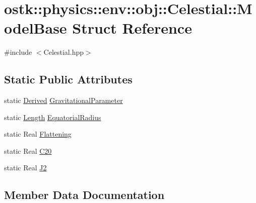 \hypertarget{structostk_1_1physics_1_1env_1_1obj_1_1_celestial_1_1_model_base}{}\section{ostk\+:\+:physics\+:\+:env\+:\+:obj\+:\+:Celestial\+:\+:Model\+Base Struct Reference}
\label{structostk_1_1physics_1_1env_1_1obj_1_1_celestial_1_1_model_base}


{\ttfamily \#include $<$Celestial.\+hpp$>$}

\subsection*{Static Public Attributes}
\begin{DoxyCompactItemize}
\item 
static \hyperlink{classostk_1_1physics_1_1units_1_1_derived}{Derived} \hyperlink{structostk_1_1physics_1_1env_1_1obj_1_1_celestial_1_1_model_base_a4c56c7c4d2a9bb05f1ae77823638b900}{Gravitational\+Parameter}
\item 
static \hyperlink{classostk_1_1physics_1_1units_1_1_length}{Length} \hyperlink{structostk_1_1physics_1_1env_1_1obj_1_1_celestial_1_1_model_base_a38c0a47396e9cb47028ffbe09a464044}{Equatorial\+Radius}
\item 
static Real \hyperlink{structostk_1_1physics_1_1env_1_1obj_1_1_celestial_1_1_model_base_a6fd974f2c2691cb5c30a845a35cd346f}{Flattening}
\item 
static Real \hyperlink{structostk_1_1physics_1_1env_1_1obj_1_1_celestial_1_1_model_base_a6279947bed22b473663d3c508bd76a3e}{C20}
\item 
static Real \hyperlink{structostk_1_1physics_1_1env_1_1obj_1_1_celestial_1_1_model_base_a80c4de90c9b3c463dc194382fa2c028c}{J2}
\end{DoxyCompactItemize}


\subsection{Member Data Documentation}
\mbox{\label{structostk_1_1physics_1_1env_1_1obj_1_1_celestial_1_1_model_base_a6279947bed22b473663d3c508bd76a3e}} 
